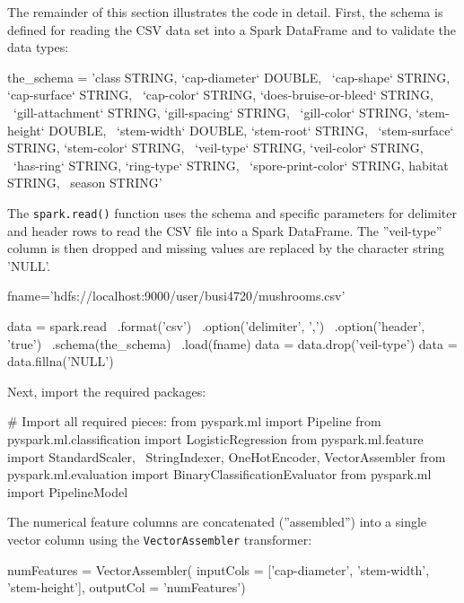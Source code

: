 The remainder of this section illustrates the code in detail. First, the schema is defined for reading the CSV data set into a Spark DataFrame and to validate the data types:

\begin{samepage}
\begin{pythoncode}
the_schema = 'class STRING, `cap-diameter` DOUBLE, \
    `cap-shape` STRING, `cap-surface` STRING, \
    `cap-color` STRING, `does-bruise-or-bleed` STRING, \
    `gill-attachment` STRING, `gill-spacing` STRING, \
    `gill-color` STRING, `stem-height` DOUBLE, \
    `stem-width` DOUBLE, `stem-root` STRING, \
    `stem-surface` STRING, `stem-color` STRING, \
    `veil-type` STRING, `veil-color` STRING, \
    `has-ring` STRING, `ring-type` STRING, \
    `spore-print-color` STRING, habitat STRING, \
    season STRING'
\end{pythoncode}
\end{samepage}

The \texttt{spark.read()} function uses the schema and specific parameters for delimiter and header rows to read the CSV file into a Spark DataFrame. The ''veil-type'' column is then dropped and missing values are replaced by the character string 'NULL'.

\begin{samepage}
\begin{pythoncode}
fname='hdfs://localhost:9000/user/busi4720/mushrooms.csv'

data = spark.read \
    .format('csv') \
    .option('delimiter', ',') \
    .option('header', 'true') \
    .schema(the_schema) \
    .load(fname)
data = data.drop('veil-type')
data = data.fillna('NULL')
\end{pythoncode}
\end{samepage}

\begin{samepage}
Next, import the required packages:
\begin{pythoncode}
# Import all required pieces:
from pyspark.ml import Pipeline
from pyspark.ml.classification import LogisticRegression
from pyspark.ml.feature import StandardScaler, \
    StringIndexer, OneHotEncoder, VectorAssembler
from pyspark.ml.evaluation import BinaryClassificationEvaluator
from pyspark.ml import PipelineModel
\end{pythoncode}
\end{samepage}

\begin{samepage}
The numerical feature columns are concatenated (''assembled'') into a single vector column using the \texttt{VectorAssembler} transformer:
\begin{pythoncode}
numFeatures = VectorAssembler(
    inputCols = ['cap-diameter', 'stem-width', 'stem-height'],
    outputCol = 'numFeatures')
\end{pythoncode}
\end{samepage}

